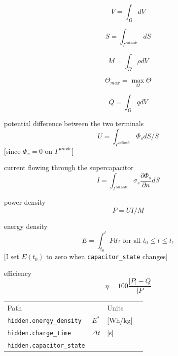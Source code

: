 \documentclass[10pt, oneside]{article}   	%
\begin{document}
\begin{equation}
V = \int_\Omega dV
\end{equation}

\begin{equation}
S = \int_{\Gamma^{cathode}} dS
\end{equation}

\begin{equation}
M = \int_{\Omega} \rho dV
\end{equation}

\begin{equation}
\Theta_{max} = \max_{\Omega} \Theta
\end{equation}

\begin{equation}
Q = \int_\Omega q dV
\end{equation}

potential difference between the two terminals
\begin{equation}
U = \int_{\Gamma^{cathode}} \Phi_s dS / S 
\end{equation}
[since $\Phi_s=0$ on $\Gamma^{anode}$]

current flowing through the supercapacitor
\begin{equation}
I = \int_{\Gamma^{cathode}} \sigma_s \frac{\partial \Phi_s}{\partial n} dS
\end{equation}

power density 
\begin{equation}
P=UI/M
\end{equation}

energy density
\begin{equation}
E=\int_{t_0}^{t} P d\tau \text{\ for\ all\ } t_0 \leq t \leq t_1
\end{equation}
[I set $E(t_0)$ to zero when \texttt{capacitor\_state} changes]

efficiency 
\begin{equation}
\eta=100\frac{|P|-Q}{|P}
\end{equation}




{\footnotesize
\begin{tabular}{llll}
Path                             &                & Units   \\
\texttt{hidden.energy\_density}  & $E^*$          & [Wh/kg] \\
\texttt{hidden.charge\_time}     & $\Delta t$     & [s]     \\
\texttt{hidden.capacitor\_state}                            \\
\end{tabular}
}
\end{document}
